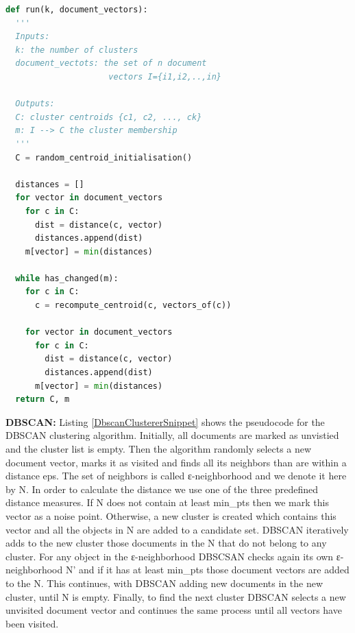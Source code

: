 \begin{lstlisting}[language=Python, label=KmeansClustererSnippet, caption=Pseudocode for k-Means algorithm]
def run(k, document_vectors):
  '''
  Inputs: 
  k: the number of clusters
  document_vectots: the set of n document 
                     vectors I={i1,i2,..,in}
  
  Outputs:
  C: cluster centroids {c1, c2, ..., ck}
  m: I --> C the cluster membership
  '''
  C = random_centroid_initialisation()
  
  distances = []
  for vector in document_vectors
    for c in C:
      dist = distance(c, vector)
      distances.append(dist)
    m[vector] = min(distances)

  while has_changed(m):
    for c in C:
      c = recompute_centroid(c, vectors_of(c))   
    
    for vector in document_vectors
      for c in C:
        dist = distance(c, vector)  
        distances.append(dist)
      m[vector] = min(distances)
  return C, m

\end{lstlisting}
\vspace{10 mm}
\textbf{DBSCAN:} Listing \ref{DbscanClustererSnippet} shows the pseudocode for the DBSCAN clustering algorithm. Initially,
all documents are marked as unvistied and the cluster list is empty. Then the algorithm randomly selects a new document vector, marks it
as visited and finds all its neighbors than are within a distance eps. The set of neighbors is called ε-neighborhood and we denote it here by N. In order to calculate the distance we use one of the three predefined distance measures. If N does not contain at least min\_pts then we mark this vector as a noise point. Otherwise, a new cluster is created which contains this vector and all the objects in N are added to a candidate set. DBSCAN iteratively adds to the new cluster those documents in the N that do not belong to any cluster. For any object in the ε-neighborhood DBSCSAN checks again its own ε-neighborhood N' and if it has at least min\_pts those document vectors are added to the N. This continues, with DBSCAN adding new documents in the new cluster, until N is empty. Finally, to find the next cluster DBSCAN selects a new unvisited document vector and continues the same process until all vectors have been visited.  

